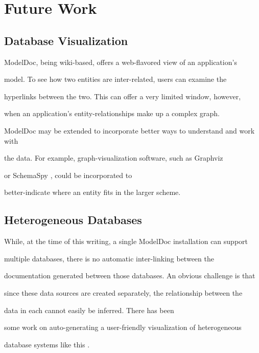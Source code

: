 \documentclass{acm_proc_article-sp}
\begin{document}
\section{Future Work}



\subsection{Database Visualization}



ModelDoc, being wiki-based, offers a web-flavored view of an application's

model.  To see how two entities are inter-related, users can examine the

hyperlinks between the two.  This can offer a very limited window, however,

when an application's entity-relationships make up a complex graph.



ModelDoc may be extended to incorporate better ways to understand and work with

the data.  For example, graph-visualization software, such as Graphviz

\cite{web:graphviz} or SchemaSpy \cite{web:schemaspy}, could be incorporated to

better-indicate where an entity fits in the larger scheme.



\subsection{Heterogeneous Databases}



While, at the time of this writing, a single ModelDoc installation can support

multiple databases, there is no automatic inter-linking between the

documentation generated between those databases.  An obvious challenge is that

since these data sources are created separately, the relationship between the

data in each cannot easily be inferred.  There has been

some work on auto-generating a user-friendly visualization of heterogeneous

database systems like this \cite{catarci:heterogeneous}.
\end{document}
